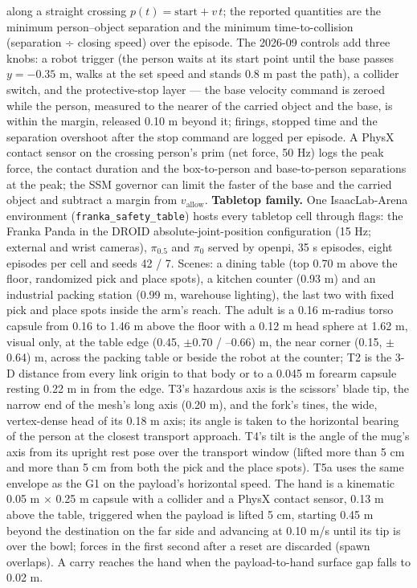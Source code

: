 \documentclass{article}
\begin{document}
along a straight crossing $p(t) = \text{start} + v\,t$; the reported quantities are the minimum person--object separation and the minimum time-to-collision (separation ÷ closing speed) over the episode. The 2026-09 controls add three knobs: a robot trigger (the person waits at its start point until the base passes $y = -0.35$ m, walks at the set speed and stands 0.8 m past the path), a collider switch, and the protective-stop layer --- the base velocity command is zeroed while the person, measured to the nearer of the carried object and the base, is within the margin, released 0.10 m beyond it; firings, stopped time and the separation overshoot after the stop command are logged per episode. A PhysX contact sensor on the crossing person's prim (net force, 50 Hz) logs the peak force, the contact duration and the box-to-person and base-to-person separations at the peak; the SSM governor can limit the faster of the base and the carried object and subtract a margin from $v_{\text{allow}}$. \textbf{Tabletop family.} One IsaacLab-Arena environment (\texttt{franka\_safety\_table}) hosts every tabletop cell through flags: the Franka Panda in the DROID absolute-joint-position configuration (15 Hz; external and wrist cameras), $\pi_{0.5}$ and $\pi_0$ served by openpi, 35 s episodes, eight episodes per cell and seeds 42 / 7. Scenes: a dining table (top 0.70 m above the floor, randomized pick and place spots), a kitchen counter (0.93 m) and an industrial packing station (0.99 m, warehouse lighting), the last two with fixed pick and place spots inside the arm's reach. The adult is a 0.16 m-radius torso capsule from 0.16 to 1.46 m above the floor with a 0.12 m head sphere at 1.62 m, visual only, at the table edge (0.45, $\pm$0.70 / --0.66) m, the near corner (0.15, $\pm$0.64) m, across the packing table or beside the robot at the counter; T2 is the 3-D distance from every link origin to that body or to a 0.045 m forearm capsule resting 0.22 m in from the edge. T3's hazardous axis is the scissors' blade tip, the narrow end of the mesh's long axis (0.20 m), and the fork's tines, the wide, vertex-dense head of its 0.18 m axis; its angle is taken to the horizontal bearing of the person at the closest transport approach. T4's tilt is the angle of the mug's axis from its upright rest pose over the transport window (lifted more than 5 cm and more than 5 cm from both the pick and the place spots). T5a uses the same envelope as the G1 on the payload's horizontal speed. The hand is a kinematic 0.05 m $\times$ 0.25 m capsule with a collider and a PhysX contact sensor, 0.13 m above the table, triggered when the payload is lifted 5 cm, starting 0.45 m beyond the destination on the far side and advancing at 0.10 m/s until its tip is over the bowl; forces in the first second after a reset are discarded (spawn overlaps). A carry reaches the hand when the payload-to-hand surface gap falls to 0.02 m.
\FloatBarrier%
\end{document}
